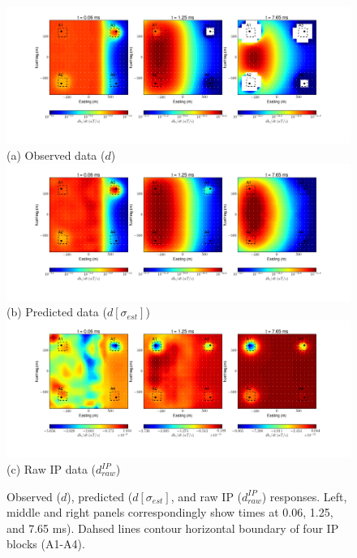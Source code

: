 \documentclass[letterpaper,11pt]{article}
\newcommand{\dip}{d^{IP}}
\begin{document}
\begin{figure}[htb]
  \centering
  \includegraphics[width=1.0\textwidth]{figures/Totalmap.png}\\(a) Observed data ($d$)
  \includegraphics[width=1.0\textwidth]{figures/FundEstmap.png}\\(b) Predicted data ($d[\sigma_{est}]$)
  \includegraphics[width=1.0\textwidth]{figures/IPobsmap.png}\\(c) Raw IP data ($\dip_{raw}$)
  \caption{Observed ($d$), predicted ($d[\sigma_{est}]$, and raw IP ($\dip_{raw}$) responses. Left, middle and right panels correspondingly show times at 0.06, 1.25, and 7.65 ms). Dahsed lines contour horizontal boundary of four IP blocks (A1-A4).}
  \label{Fig:ObsPredIPResp}
\end{figure}
\end{document}
